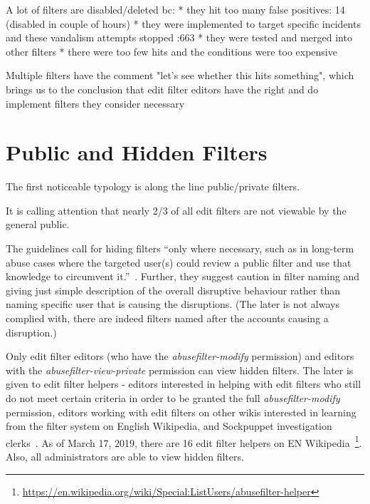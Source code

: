 A lot of filters are disabled/deleted bc:
* they hit too many false positives: 14 (disabled in couple of hours)
* they were implemented to target specific incidents and these vandalism attempts stopped :663
* they were tested and merged into other filters
* there were too few hits and the conditions were too expensive

Multiple filters have the comment "let's see whether this hits something", which brings us to the conclusion that edit filter editors have the right and do implement filters they consider necessary



\section{Public and Hidden Filters}

The first noticeable typology is along the line public/private filters.

It is calling attention that nearly 2/3 of all edit filters are not viewable by the general public.

The guidelines call for hiding filters ``only where necessary, such as in long-term abuse cases where the targeted user(s) could review a public filter and use that knowledge to circumvent it.''~\cite{Wikipedia:EditFilter}.
Further, they suggest caution in filter naming and giving just simple description of the overall disruptive behaviour rather than naming specific user that is causing the disruptions.
(The later is not always complied with, there are indeed filters named after the accounts causing a disruption.)

Only edit filter editors (who have the \emph{abusefilter-modify} permission) and editors with the \emph{abusefilter-view-private} permission can view hidden filters.
The later is given to edit filter helpers - editors interested in helping with edit filters who still do not meet certain criteria in order to be granted the full \emph{abusefilter-modify} permission, editors working with edit filters on other wikis interested in learning from the filter system on English Wikipedia, and Sockpuppet investigation clerks~\cite{Wikipedia:EditFilterHelper}.
As of March 17, 2019, there are 16 edit filter helpers on EN Wikipedia~\footnote{\url{https://en.wikipedia.org/wiki/Special:ListUsers/abusefilter-helper}}.
Also, all administrators are able to view hidden filters.

